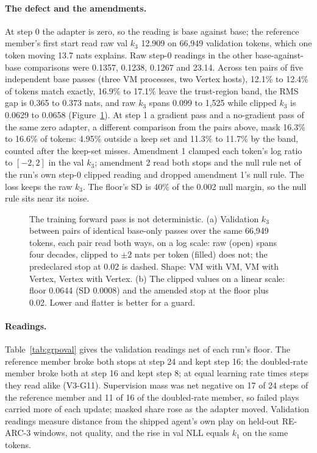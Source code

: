 \paragraph{The defect and the amendments.}
At step 0 the adapter is zero, so the reading is base against base; the reference member's first start read raw val $k_3$ 12.909 on 66,949 validation tokens, which one token moving 13.7 nats explains. %
Raw step-0 readings in the other base-against-base comparisons were 0.1357, 0.1238, 0.1267 and 23.14. %
Across ten pairs of five independent base passes (three VM processes, two Vertex hosts), 12.1\% to 12.4\% of tokens match exactly, 16.9\% to 17.1\% leave the trust-region band, the RMS gap is 0.365 to 0.373 nats, and raw $k_3$ spans 0.099 to 1,525 while clipped $k_3$ is 0.0629 to 0.0658 (Figure~\ref{fig:trainnoise}). %
At step 1 a gradient pass and a no-gradient pass of the same zero adapter, a different comparison from the pairs above, mask 16.3\% to 16.6\% of tokens: 4.95\% outside a keep set and 11.3\% to 11.7\% by the band, counted after the keep-set misses. %
Amendment 1 clamped each token's log ratio to $[-2, 2]$ in the val $k_3$; amendment 2 read both stops and the null rule net of the run's own step-0 clipped reading and dropped amendment 1's null rule. %
The loss keeps the raw $k_3$. The floor's SD is 40\% of the 0.002 null margin, so the null rule sits near its noise. %

\begin{figure}[!htb]
\centering
{}
\caption{The training forward pass is not deterministic. (a) Validation $k_3$ between pairs of identical base-only passes over the same 66,949 tokens, each pair read both ways, on a log scale: raw (open) spans four decades, clipped to $\pm2$ nats per token (filled) does not; the predeclared stop at 0.02 is dashed. Shape: VM with VM, VM with Vertex, Vertex with Vertex. (b) The clipped values on a linear scale: floor 0.0644 (SD 0.0008) and the amended stop at the floor plus 0.02. Lower and flatter is better for a guard.}\label{fig:trainnoise} %
\end{figure}

\paragraph{Readings.}
Table~\ref{tab:grpoval} gives the validation readings net of each run's floor. %
The reference member broke both stops at step 24 and kept step 16; the doubled-rate member broke both at step 16 and kept step 8; at equal learning rate times steps they read alike (V3-G11). %
Supervision mass was net negative on 17 of 24 steps of the reference member and 11 of 16 of the doubled-rate member, so failed plays carried more of each update; masked share rose as the adapter moved. %
Validation readings measure distance from the shipped agent's own play on held-out RE-ARC-3 windows, not quality, and the rise in val NLL equals $k_1$ on the same tokens. %

